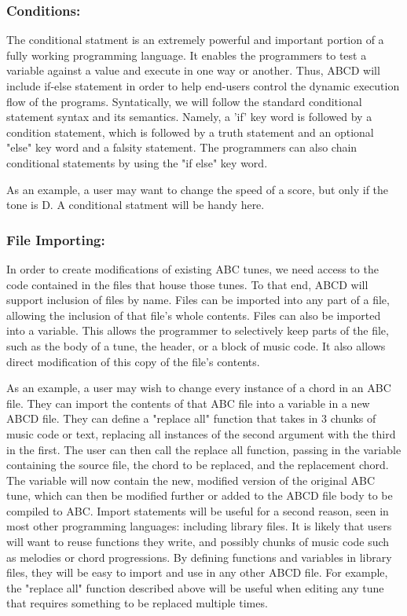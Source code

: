     \subsubsection{Conditions:}
        The conditional statment is an extremely powerful and important portion of a fully working programming language. It enables the programmers to test a variable against a value and execute in one way or another. Thus, ABCD will include if-else statement in order to help end-users control the dynamic execution flow of the programs. Syntatically, we will follow the standard conditional statement syntax and its semantics. Namely, a 'if' key word is followed by a condition statement, which is followed by a truth statement and an optional "else" key word and a falsity statement. The programmers can also chain conditional statements by using the "if else" key word.

        As an example, a user may want to change the speed of a score, but only if the tone is D. A conditional statment will be handy here.

    \subsubsection{File Importing:}
    In order to create modifications of existing ABC tunes, we need access to the code contained in the files that house those tunes. To that end, ABCD will support inclusion of files by name. Files can be imported into any part of a file, allowing the inclusion of that file's whole contents. Files can also be imported into a variable. This allows the programmer to selectively keep parts of the file, such as the body of a tune, the header, or a block of music code. It also allows direct modification of this copy of the file's contents. 
    
    As an example, a user may wish to change every instance of a chord in an ABC file. They can import the contents of that ABC file into a variable in a new ABCD file. They can define a "replace all" function that takes in 3 chunks of music code or text, replacing all instances of the second argument with the third in the first. The user can then call the replace all function, passing in the variable containing the source file, the chord to be replaced, and the replacement chord. The variable will now contain the new, modified version of the original ABC tune, which can then be modified further or added to the ABCD file body to be compiled to ABC.
    Import statements will be useful for a second reason, seen in most other programming languages: including library files. It is likely that users will want to reuse functions they write, and possibly chunks of music code such as melodies or chord progressions. By defining functions and variables in library files, they will be easy to import and use in any other ABCD file. For example, the "replace all" function described above will be useful when editing any tune that requires something to be replaced multiple times.
    
